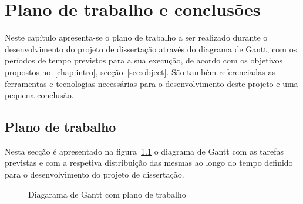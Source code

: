 \chapter{Plano de trabalho e conclusões}\label{chap:chap3}

Neste capítulo apresenta-se o plano de trabalho a ser realizado durante o desenvolvimento do projeto de dissertação através do diagrama de Gantt, com os períodos de tempo previstos para a sua execução, de acordo com os objetivos propostos no~\ref{chap:intro}, secção~\ref{sec:object}. São também referenciadas as ferramentas e tecnologias necessárias para o desenvolvimento deste projeto e uma pequena conclusão.

\section{Plano de trabalho}

Nesta secção é apresentado na figura~\ref{fig:gantt} o diagrama de Gantt com as tarefas previstas e com a respetiva distribuição das mesmas ao longo do tempo definido para o desenvolvimento do projeto de dissertação.  

\begin{figure}[h]
\caption{Diagarama de Gantt com plano de trabalho}
\label{fig:gantt}
\end{figure}

